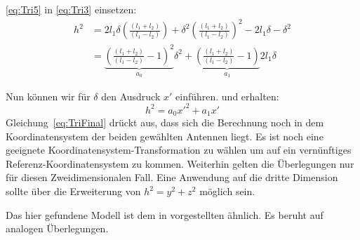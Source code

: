 \eqref{eq:Tri5} in \eqref{eq:Tri3} einsetzen:
\begin{align}
	h^2 &= 2l_1\delta\left(\frac{(l_1 + l_2)}{(l_1 - l_2)}\right) + \delta^2\left(\frac{(l_1 + l_2)}{(l_1 - l_2)}\right)^2 - 2l_1 \delta - \delta^2 \nonumber \\
	&= \underbrace{\left(\frac{(l_1 + l_2)}{(l_1 - l_2)} - 1 \right)^2}_\text{$a_0$} \delta^2 + \underbrace{\left(\frac{(l_1 + l_2)}{(l_1 - l_2)}  - 1 \right)}_\text{$a_1$} 2l_1\delta
\end{align}

Nun können wir für $\delta$ den Ausdruck $x'$ einführen. und erhalten:
\begin{equation}
	h^2 = a_0 x'^2 + a_1 x' \label{eq:TriFinal}
\end{equation}
%
Gleichung~\eqref{eq:TriFinal} drückt aus, dass sich die Berechnung noch in dem Koordinatensystem der beiden gewählten Antennen liegt. Es ist noch eine geeignete Koordinatensystem-Transformation zu wählen um auf ein vernünftiges Referenz-Koordinatensystem zu kommen.
Weiterhin gelten die Überlegungen nur für diesen Zweidimensionalen Fall. Eine Anwendung auf die dritte Dimension sollte über die Erweiterung von $h^2 = y^2+z^2$ möglich sein.

Das hier gefundene Modell ist dem in \cite{Wil1} vorgestellten ähnlich. Es beruht auf analogen Überlegungen. 